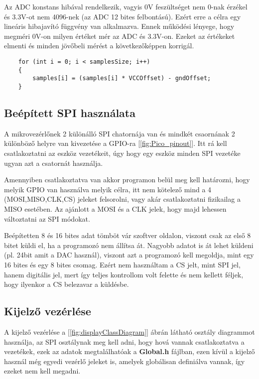 Az ADC konstans hibával rendelkezik, vagyis 0V feszültséget nem 0-nak érzékel
és 3.3V-ot nem 4096-nek (az ADC 12 bites felbontású). Ezért erre a célra egy
lineáris hibajavító függvény van alkalmazva. Ennek működési lényege, hogy
megméri 0V-on milyen értéket mér az ADC és 3.3V-on. Ezeket az értékeket elmenti
és minden jövőbeli mérést a következőképpen korrigál.


\begin{lstlisting}
    for (int i = 0; i < samplesSize; i++)
    {
        samples[i] = (samples[i] * VCCOffset) - gndOffset;
    }
\end{lstlisting}

\subsection{Beépített SPI használata}

A mikrovezérlőnek 2 különálló SPI chatornája van és mindkét csaornának 2 különböző
helyre van kivezetése a GPIO-ra [\ref{fig:Pico_pinout}]. Itt rá kell csatlakoztatni az eszköz vezetékeit, úgy
hogy egy eszköz minden SPI vezetéke ugyan azt a csatornát használja.

Amennyiben csatlakoztatva van akkor programon belül meg kell határozni, hogy 
melyik GPIO van használva melyik célra, itt nem kötelező mind a 4 (MOSI,MISO,CLK,CS)
jeleket felsorolni, vagy akár csatlakoztatni fizikailag a MISO esetében. Az 
ajánlott a MOSI és a CLK jelek, hogy majd lehessen változtatni az SPI módokat.

Beépítetten 8 és 16 bites adat tömböt vár szoftver oldalon, viszont csak az első
8 bitet küldi el, ha a programozó nem állítsa át. Nagyobb adatot is át lehet 
küldeni (pl. 24bit amit a DAC használ), viszont azt a programozó kell megoldja,
mint egy 16 bites és egy 8 bites csomag. Ezért nem használtam a CS jelt, mint 
SPI jel, hanem digitális jel, mert így teljes kontrollom volt felette és nem 
kellett féljek, hogy ilyenkor a CS belezavar a küldésbe.


\subsection{Kijelző vezérlése}

A kijelző vezérlése a [\ref{fig:displayClassDiagram}] ábrán látható osztály diagrammot használja, 
az SPI osztálynak meg kell adni, hogy hová vannak csatlakoztatva a vezetékek, 
ezek az adatok megtalálhatóak a \textbf{Global.h} fájlban, ezen kívül a 
kijelző használ még egyedi vezérlő jeleket is, amelyek globálisan definiálva vannak,
így ezeket nem kell megadni. 

